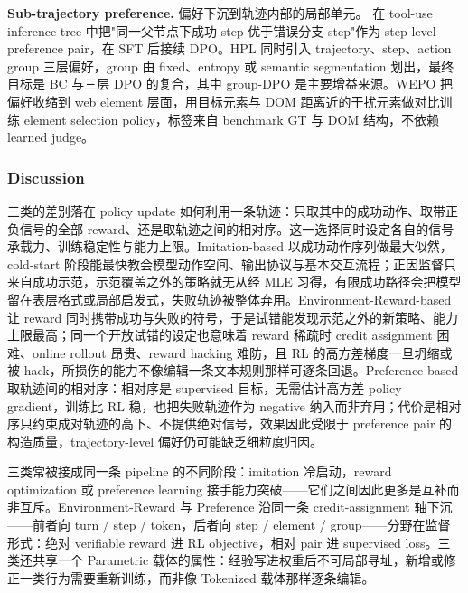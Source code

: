 \textbf{Sub-trajectory preference.} 偏好下沉到轨迹内部的局部单元。\cite{Che24k} 在 tool-use inference tree 中把"同一父节点下成功 step 优于错误分支 step"作为 step-level preference pair，在 SFT 后接续 DPO。HPL \cite{Gao25c} 同时引入 trajectory、step、action group 三层偏好，group 由 fixed、entropy 或 semantic segmentation 划出，最终目标是 BC 与三层 DPO 的复合，其中 group-DPO 是主要增益来源。WEPO \cite{Liu25z} 把偏好收缩到 web element 层面，用目标元素与 DOM 距离近的干扰元素做对比训练 element selection policy，标签来自 benchmark GT 与 DOM 结构，不依赖 learned judge。




\subsubsection{Discussion}

三类的差别落在 policy update 如何利用一条轨迹：只取其中的成功动作、取带正负信号的全部 reward、还是取轨迹之间的相对序。这一选择同时设定各自的信号承载力、训练稳定性与能力上限。Imitation-based 以成功动作序列做最大似然，cold-start 阶段能最快教会模型动作空间、输出协议与基本交互流程；正因监督只来自成功示范，示范覆盖之外的策略就无从经 MLE 习得，有限成功路径会把模型留在表层格式或局部启发式，失败轨迹被整体弃用。Environment-Reward-based 让 reward 同时携带成功与失败的符号，于是试错能发现示范之外的新策略、能力上限最高；同一个开放试错的设定也意味着 reward 稀疏时 credit assignment 困难、online rollout 昂贵、reward hacking 难防，且 RL 的高方差梯度一旦坍缩或被 hack，所损伤的能力不像编辑一条文本规则那样可逐条回退。Preference-based 取轨迹间的相对序：相对序是 supervised 目标，无需估计高方差 policy gradient，训练比 RL 稳，也把失败轨迹作为 negative 纳入而非弃用；代价是相对序只约束成对轨迹的高下、不提供绝对信号，效果因此受限于 preference pair 的构造质量，trajectory-level 偏好仍可能缺乏细粒度归因。

三类常被接成同一条 pipeline 的不同阶段：imitation 冷启动，reward optimization 或 preference learning 接手能力突破——它们之间因此更多是互补而非互斥。Environment-Reward 与 Preference 沿同一条 credit-assignment 轴下沉——前者向 turn / step / token，后者向 step / element / group——分野在监督形式：绝对 verifiable reward 进 RL objective，相对 pair 进 supervised loss。三类还共享一个 Parametric 载体的属性：经验写进权重后不可局部寻址，新增或修正一类行为需要重新训练，而非像 Tokenized 载体那样逐条编辑。
